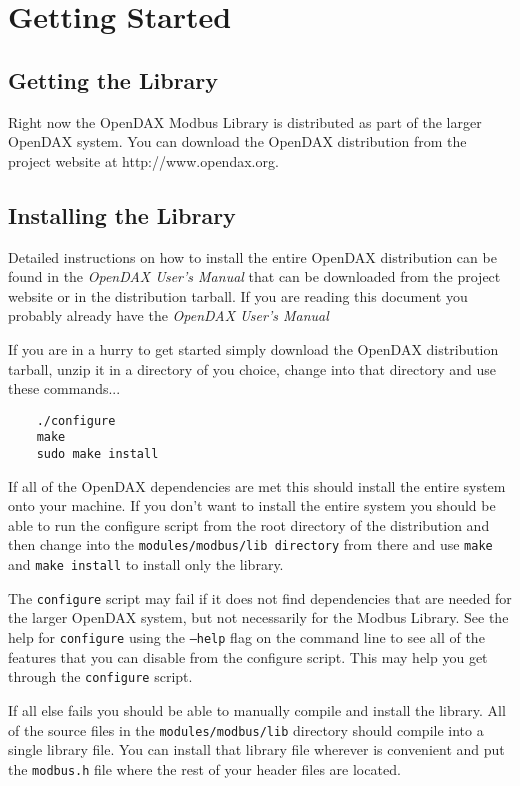 \chapter{Getting Started}
\section{Getting the Library}
Right now the OpenDAX Modbus Library is distributed as part of the larger OpenDAX system.  You can download the OpenDAX distribution from the project website at http://www.opendax.org.

\section{Installing the Library}
Detailed instructions on how to install the entire OpenDAX distribution can be found in the \textit{OpenDAX User's Manual} that can be downloaded from the project website or in the distribution tarball.  If you are reading this document you probably already have the \textit{OpenDAX User's Manual}

If you are in a hurry to get started simply download the OpenDAX distribution tarball, unzip it in a directory of you choice, change into that directory and use these commands...

\begin{verbatim}
    ./configure
    make
    sudo make install 
\end{verbatim} 

If all of the OpenDAX dependencies are met this should install the entire system onto your machine.  If you don't want to install the entire system you should be able to run the configure script from the root directory of the distribution and then change into the \texttt{modules/modbus/lib directory} from there and use \texttt{make} and \texttt{make install} to install only the library.

The \texttt{configure} script may fail if it does not find dependencies that are needed for the larger OpenDAX system, but not necessarily for the Modbus Library.  See the help for \texttt{configure} using the \texttt{--help} flag on the command line to see all of the features that you can disable from the configure script.  This may help you get through the \texttt{configure} script.

If all else fails you should be able to manually compile and install the library.  All of the source files in the \texttt{modules/modbus/lib} directory should compile into a single library file.  You can install that library file wherever is convenient and put the \texttt{modbus.h} file where the rest of your header files are located.

